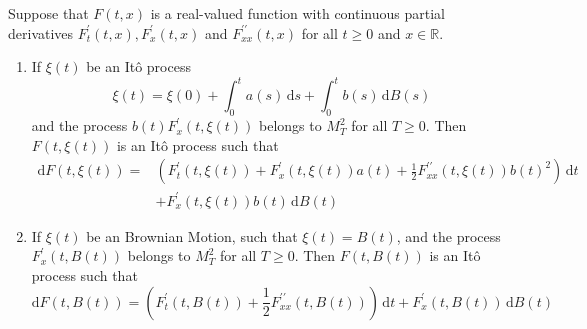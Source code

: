 \begin{theorem}[It\^o Formula]
    Suppose that $F(t,x)$ is a real-valued function with continuous partial derivatives $F_{t}^{\prime}(t,x),F_{x}^{\prime}(t,x)$ and $F_{xx}^{\prime\prime}(t,x)$ for all $t\geq 0$ and $x\in\mathbb{R}$.

    \begin{enumerate}
        \item If $\xi(t)$ be an It\^o process
              \begin{equation*}
                  \xi(t)=\xi(0)+\int_{0}^{t}a(s)\,\mathrm{d}s+\int_{0}^{t}b(s)\,\mathrm{d}B(s)
              \end{equation*}
              and the process $b(t)F_{x}^{\prime}(t,\xi(t))$ belongs to $M_{T}^{2}$ for all $T\geq 0$. Then $F(t,\xi(t))$ is an It\^o process such that
              \begin{equation}
                  \begin{aligned}
                      \mathrm{d}F(t,\xi(t))= & \left(F_{t}^{\prime}(t,\xi(t))+F_{x}^{\prime}(t,\xi(t))a(t)+\frac{1}{2}F_{xx}^{\prime\prime}(t,\xi(t))b(t)^{2}\right)\,\mathrm{d}t \\
                                             & +F_{x}^{\prime}(t,\xi(t))b(t)\,\mathrm{d}B(t)
                  \end{aligned}
              \end{equation}
        \item If $\xi(t)$ be an Brownian Motion, such that $\xi(t)=B(t)$, and the process $F_{x}^{\prime}(t,B(t))$ belongs to $M_{T}^{2}$ for all $T \geq 0$. Then $F(t,B(t))$ is an It\^o process such that
              \begin{equation}
                  \mathrm{d}F(t,B(t))=\left(F_{t}^{\prime}(t,B(t))+\frac{1}{2}F_{xx}^{\prime\prime}(t,B(t))\right)\,\mathrm{d}t+F_{x}^{\prime}(t,B(t))\,\mathrm{d}B(t)
              \end{equation}
    \end{enumerate}
\end{theorem}

